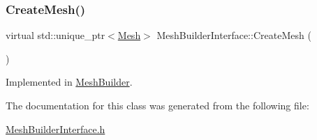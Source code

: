 \subsubsection{\texorpdfstring{CreateMesh()}{CreateMesh()}}
{\footnotesize\ttfamily virtual std\+::unique\+\_\+ptr$<$\mbox{\hyperlink{class_mesh}{Mesh}}$>$ Mesh\+Builder\+Interface\+::\+Create\+Mesh (\begin{DoxyParamCaption}\item[{\mbox{\hyperlink{_mesh_builder_interface_8h_ad6436347ddb93aed826a19081b53dd61}{M\+E\+S\+H\+T\+Y\+PE}}}]{ }\end{DoxyParamCaption})\hspace{0.3cm}{\ttfamily [pure virtual]}}



Implemented in \mbox{\hyperlink{class_mesh_builder_a51d89fe601df06e63112c70416ac03dc}{Mesh\+Builder}}.



The documentation for this class was generated from the following file\+:\begin{DoxyCompactItemize}
\item 
\mbox{\hyperlink{_mesh_builder_interface_8h}{Mesh\+Builder\+Interface.\+h}}\end{DoxyCompactItemize}
